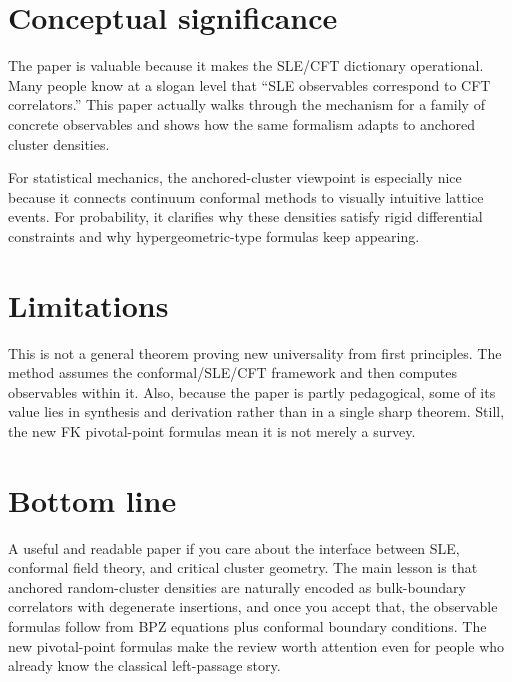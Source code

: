 \documentclass[11pt]{article}
\begin{document}
\section*{Conceptual significance}
The paper is valuable because it makes the SLE/CFT dictionary operational. Many people know at a slogan level that ``SLE observables correspond to CFT correlators.'' This paper actually walks through the mechanism for a family of concrete observables and shows how the same formalism adapts to anchored cluster densities.

For statistical mechanics, the anchored-cluster viewpoint is especially nice because it connects continuum conformal methods to visually intuitive lattice events. For probability, it clarifies why these densities satisfy rigid differential constraints and why hypergeometric-type formulas keep appearing.
\section*{Limitations}
This is not a general theorem proving new universality from first principles. The method assumes the conformal/SLE/CFT framework and then computes observables within it. Also, because the paper is partly pedagogical, some of its value lies in synthesis and derivation rather than in a single sharp theorem. Still, the new FK pivotal-point formulas mean it is not merely a survey.
\section*{Bottom line}
A useful and readable paper if you care about the interface between SLE, conformal field theory, and critical cluster geometry. The main lesson is that anchored random-cluster densities are naturally encoded as bulk-boundary correlators with degenerate insertions, and once you accept that, the observable formulas follow from BPZ equations plus conformal boundary conditions. The new pivotal-point formulas make the review worth attention even for people who already know the classical left-passage story.
\end{document}
